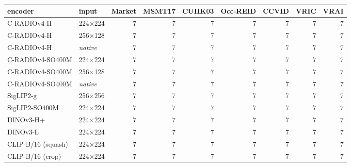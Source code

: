 \begin{tabular}{llrrrrrrr}
\toprule
encoder & input & Market & MSMT17 & CUHK03 & Occ-REID & CCVID & VRIC & VRAI \\
\midrule
C-RADIOv4-H & 224$\times$224 & 7 & 7 & 7 & 7 & 7 & 7 & 7 \\
C-RADIOv4-H & 256$\times$128 & 7 & 7 & 7 & 7 & 7 & 7 & 7 \\
C-RADIOv4-H & \textit{native} & 7 & 7 & 7 & 7 & 7 & 7 & 7 \\
C-RADIOv4-SO400M & 224$\times$224 & 7 & 7 & 7 & 7 & 7 & 7 & 7 \\
C-RADIOv4-SO400M & 256$\times$128 & 7 & 7 & 7 & 7 & 7 & 7 & 7 \\
C-RADIOv4-SO400M & \textit{native} & 7 & 7 & 7 & 7 & 7 & 7 & 7 \\
SigLIP2-g & 256$\times$256 & 7 & 7 & 7 & 7 & 7 & 7 & 7 \\
SigLIP2-SO400M & 224$\times$224 & 7 & 7 & 7 & 7 & 7 & 7 & 7 \\
DINOv3-H+ & 224$\times$224 & 7 & 7 & 7 & 7 & 7 & 7 & 7 \\
DINOv3-L & 224$\times$224 & 7 & 7 & 7 & 7 & 7 & 7 & 7 \\
CLIP-B/16 (squash) & 224$\times$224 & 7 & 7 & 7 & 7 & 7 & 7 & 7 \\
CLIP-B/16 (crop) & 224$\times$224 & 7 & 7 & 7 & 7 & 7 & 7 & 7 \\
\bottomrule
\end{tabular}
